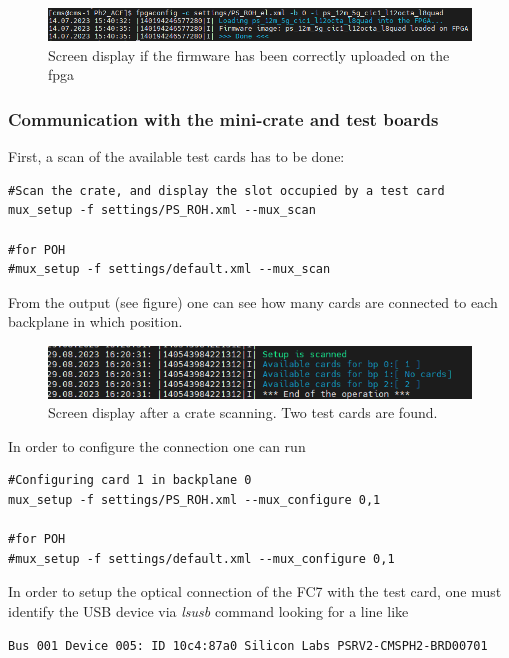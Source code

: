 \documentclass[10pt,a4paper]{article}
\begin{document}
\begin{figure}[h!]
\centering
 \includegraphics[width=\linewidth]{firmware-writing.png} 
  \caption{Screen display if the firmware has been correctly uploaded on the fpga}
\end{figure}

\subsubsection{Communication with the mini-crate and test boards}
First, a scan of the available test cards has to be done:
\begin{framed}
\begin{verbatim}
#Scan the crate, and display the slot occupied by a test card
mux_setup -f settings/PS_ROH.xml --mux_scan

#for POH
#mux_setup -f settings/default.xml --mux_scan 
\end{verbatim}
\end{framed}
From the output (see figure) one can see how many cards are connected to each backplane in which position.
\begin{figure}[h!]
\centering
 \includegraphics[width=\linewidth]{mux_scan.png} 
  \caption{Screen display after a crate scanning. Two test cards are found.}
\end{figure}
In order to configure the connection one can run 
\begin{framed}
\begin{verbatim}
#Configuring card 1 in backplane 0
mux_setup -f settings/PS_ROH.xml --mux_configure 0,1

#for POH
#mux_setup -f settings/default.xml --mux_configure 0,1
\end{verbatim}
\end{framed}
In order to setup the optical connection of the FC7 with the test card, one must identify the USB device via {\it lsusb} command looking for a line like
\begin{framed}
\begin{verbatim}
Bus 001 Device 005: ID 10c4:87a0 Silicon Labs PSRV2-CMSPH2-BRD00701 
\end{verbatim}
\end{framed}
\end{document}
